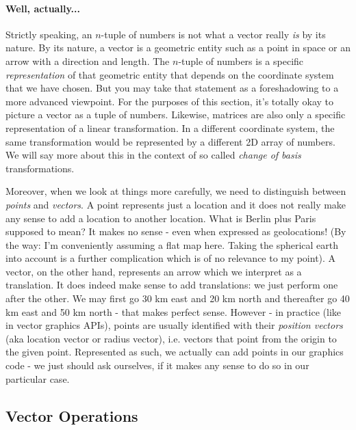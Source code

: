 

\paragraph{Well, actually...}
Strictly speaking, an $n$-tuple of numbers is not what a vector really \emph{is} by its nature. By its nature, a vector is a geometric entity such as a point in space or an arrow with a direction and length. The $n$-tuple of numbers is a specific \emph{representation} of that geometric entity that depends on the coordinate system that we have chosen. But you may take that statement as a foreshadowing to a more advanced viewpoint. For the purposes of this section, it's totally okay to picture a vector as a tuple of numbers. Likewise, matrices are also only a specific representation of a linear transformation. In a different coordinate system, the same transformation would be represented by a different 2D array of numbers. We will say more about this in the context of so called \emph{change of basis} transformations.

\medskip
Moreover, when we look at things more carefully, we need to distinguish between \emph{points} and \emph{vectors}. A point represents just a location and it does not really make any sense to add a location to another location. What is Berlin plus Paris supposed to mean? It makes no sense - even when expressed as geolocations! (By the way: I'm conveniently assuming a flat map here. Taking the spherical earth into account is a further complication which is of no relevance to my point). A vector, on the other hand, represents an arrow which we interpret as a translation. It does indeed make sense to add translations: we just perform one after the other. We may first go 30 km east and 20 km north and thereafter go 40 km east and 50 km north - that makes perfect sense. However - in practice (like in vector graphics APIs), points are usually identified with their \emph{position vectors} (aka location vector or radius vector), i.e. vectors that point from the origin to the given point. Represented as such, we actually can add points in our graphics code - we just should ask ourselves, if it makes any sense to do so in our particular case.


\subsection{Vector Operations}


